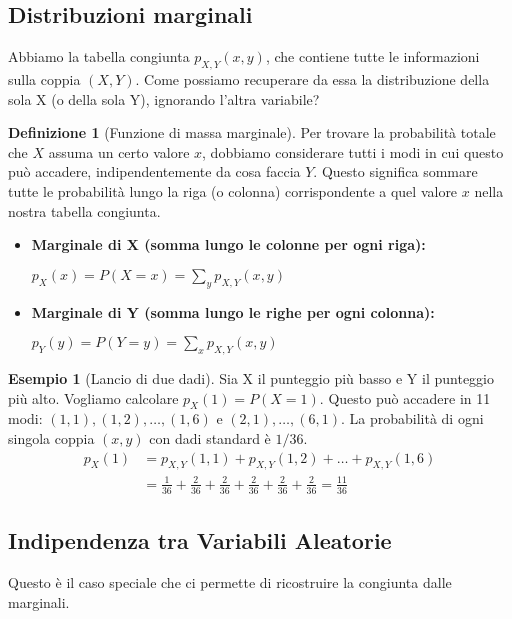 \documentclass[a4paper, 11pt]{article}
\theoremstyle{definition}
\newtheorem{definizione}{Definizione}[section]
\newtheorem{esempio}{Esempio}[section]
\begin{document}
\subsection{Distribuzioni marginali}
Abbiamo la tabella congiunta $p_{X,Y}(x,y)$, che contiene tutte le informazioni sulla coppia $(X,Y)$. Come possiamo recuperare da essa la distribuzione della sola X (o della sola Y), ignorando l'altra variabile?

\begin{definizione}[Funzione di massa marginale]
Per trovare la probabilità totale che $X$ assuma un certo valore $x$, dobbiamo considerare tutti i modi in cui questo può accadere, indipendentemente da cosa faccia $Y$. Questo significa sommare tutte le probabilità lungo la riga (o colonna) corrispondente a quel valore $x$ nella nostra tabella congiunta.
\begin{itemize}
    \item \textbf{Marginale di X (somma lungo le colonne per ogni riga):}
    \begin{formulabox}
        $p_X(x) = P(X=x) = \sum_{y} p_{X,Y}(x,y)$
    \end{formulabox}

    \item \textbf{Marginale di Y (somma lungo le righe per ogni colonna):}
    \begin{formulabox}
        $p_Y(y) = P(Y=y) = \sum_{x} p_{X,Y}(x,y)$
    \end{formulabox}
\end{itemize}
\end{definizione}

\begin{esempio}[Lancio di due dadi]
Sia X il punteggio più basso e Y il punteggio più alto. Vogliamo calcolare $p_X(1) = P(X=1)$.
Questo può accadere in 11 modi: $(1,1), (1,2), \dots, (1,6)$ e $(2,1), \dots, (6,1)$.
La probabilità di ogni singola coppia $(x,y)$ con dadi standard è $1/36$.
\begin{align*}
p_X(1) &= p_{X,Y}(1,1) + p_{X,Y}(1,2) + \dots + p_{X,Y}(1,6) \\
&= \frac{1}{36} + \frac{2}{36} + \frac{2}{36} + \frac{2}{36} + \frac{2}{36} + \frac{2}{36} = \frac{11}{36}
\end{align*}
\end{esempio}

\subsection{Indipendenza tra Variabili Aleatorie}
Questo è il caso speciale che ci permette di ricostruire la congiunta dalle marginali.
\end{document}
